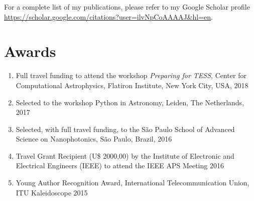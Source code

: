 \documentclass[10pt]{article}
\begin{document}
\begin{titlepage}
For a complete list of my publications, please refer to my Google Scholar profile \url{https://scholar.google.com/citations?user=ilvNpCoAAAAJ&hl=en}.

\section*{Awards}
\begin{enumerate}
  \item Full travel funding to attend the workshop \textit{Preparing for TESS}, Center for Computational Astrophysics, Flatiron Institute, New York City, USA, 2018
  \item Selected to the workshop \textsf{Python} in Astronomy, Leiden, The Netherlands, 2017
  \item Selected, with full travel funding, to the S\~ao Paulo School of Advanced Science on Nanophotonics, S\~ao Paulo, Brazil, 2016
  \item Travel Grant Recipient (U\$ 2000,00) by the Institute of Electronic and Electrical Engineers (IEEE) to attend the IEEE APS Meeting 2016
  \item Young Author Recognition Award, International Telecommunication Union, ITU Kaleidoscope 2015
\end{enumerate}


\end{titlepage}
\end{document}
